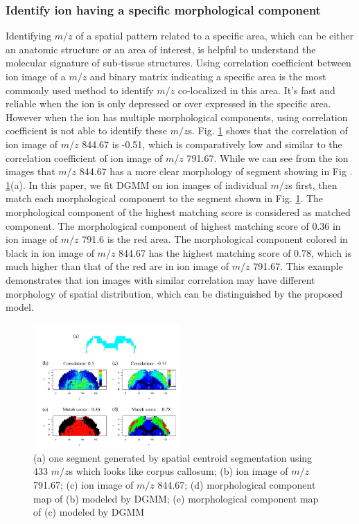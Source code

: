 \documentclass{bioinfo}
\begin{document}
\subsubsection{Identify ion having a specific morphological component}
Identifying $m/z$ of a spatial pattern related to a specific area, which can be either an anatomic structure or an area of interest, is helpful to understand the molecular signature of sub-tissue structures. Using correlation coefficient between ion image of a $m/z$ and binary matrix indicating a specific area is the most commonly used method to identify $m/z$ co-localized in this area. It's fast and reliable when the ion is only depressed or over expressed in the specific area. However when the ion has multiple morphological components, using correlation coefficient is not able to identify these $m/z$s. Fig. \ref{fig:figure6} shows that the correlation of ion image of $m/z$  844.67 is -0.51, which is comparatively low and similar to the correlation coefficient of ion image of $m/z$ 791.67. While we can see from the ion images that $m/z$  844.67 has a more clear morphology of segment showing in Fig . \ref{fig:figure6}(a). In this paper, we fit DGMM on ion images of individual $m/z$s first, then match each morphological component to the segment shown in Fig. \ref{fig:figure6}.  The morphological component of the highest matching score is considered as matched component. The morphological component of highest matching score of 0.36 in ion image of $m/z$ 791.6 is the red area. The morphological component colored in black  in ion image of $m/z$ 844.67 has the highest matching score of 0.78, which is much higher than that of the red are in ion image of $m/z$ 791.67. This example demonstrates that ion images with similar correlation may have different morphology of spatial distribution, which can be distinguished by the proposed model. 
\begin{figure}[b!]
    
	\includegraphics[width=0.5\textwidth]{figure6.jpg}
    \caption{(a) one segment generated by spatial centroid segmentation using 433 $m/z$s which looks like corpus callosum; (b) ion image of $m/z$ 791.67; (c) ion image of $m/z$  844.67; (d) morphological component map of (b) modeled by DGMM; (e) morphological component map of (c) modeled by DGMM }
    \label{fig:figure6}
\end{figure}
\end{document}
